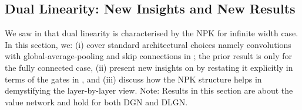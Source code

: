 \subsection{Dual Linearity: New Insights and New Results}\label{sec:analysis}
We saw in  that dual linearity is characterised by the NPK for infinite width case. In this section, we: (i) cover standard architectural choices namely convolutions with global-average-pooling and skip connections in ; the prior result  is only for the fully connected case, (ii)  present new insights on  by restating it explicitly in terms of the gates in , and (iii) discuss how the NPK structure helps in demystifying the layer-by-layer view. Note: Results in this section are about the value network and hold for both DGN and DLGN.


